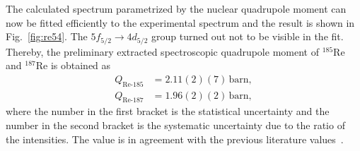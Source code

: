 The calculated spectrum parametrized by the nuclear quadrupole moment can now be fitted efficiently to the experimental spectrum and the result is shown in Fig.~\ref{fig:re54}. The $5f_{5/2}\rightarrow 4d_{5/2}$ group turned out not to be visible in the fit. Thereby, the preliminary extracted spectroscopic quadrupole moment of $^{185}$Re and $^{187}$Re is obtained as
\begin{align}
Q_{\text{Re-}185} &= 2.11(2)(7)\,\text{barn},\\
Q_{\text{Re-}187} &= 1.96(2)(2)\,\text{barn},
\end{align}
where the number in the first bracket is the statistical uncertainty and the number in the second bracket is the systematic uncertainty due to the ratio of the intensities. The value is in agreement with the previous literature values~\cite{Stone2005}.

